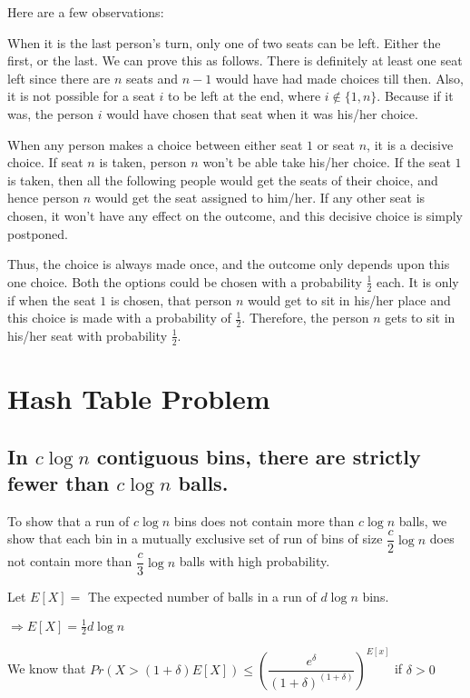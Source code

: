\documentclass{article}
\begin{document}
Here are a few observations: 

When it is the last person's turn, only one of two seats can be left. 
Either the first, or the last. We can prove this as follows. There is definitely 
at least one seat left since there are $n$ seats and $n-1$ would have had made 
choices till then. Also, it is not possible for a seat $i$ to be
left at the end, where $i \notin  \{ 1, n \}$. Because if it was, the person $i$ would
have chosen that seat when it was his/her choice. 

When any person makes a choice between either seat $1$ or seat $n$, it is a decisive choice.
If seat $n$ is taken, person $n$ won't be able take his/her choice. If the seat
$1$ is taken, then all the following people would get the seats of their choice, and
hence person $n$ would get the seat assigned to him/her. If any other seat is 
chosen, it won't have any effect on the outcome, and this decisive choice
is simply postponed. 

Thus, the choice is always made once, and the outcome only depends upon this one
choice. Both the options could be chosen with a probability $\frac{1}{2}$ each. It is
only if when the seat $1$ is chosen, that person $n$ would get to sit in his/her place
and this choice is made with a probability of $\frac{1}{2}$. Therefore, the person
$n$ gets to sit in his/her seat with probability $\frac{1}{2}$. 


\clearpage

\section{Hash Table Problem}
\subsection{In $c\log{n}$ contiguous bins, there are strictly
fewer than $c\log{n}$ balls.}

To show that a run of $c\log{n}$ bins does not contain more than
$c\log{n}$ balls, we show that each bin in a mutually exclusive set of run of bins
of size $\dfrac{c}{2}\log{n}$ does not contain more than
$\dfrac{c}{3}\log{n}$ balls with high probability.

Let $E[X] =$ The expected number of balls in a run of $d\log{n}$ bins.

$\Rightarrow E[X] = \frac{1}{2}d\log{n}$

We know that $Pr(X > (1+\delta)E[X]) \le \left( \dfrac{e^\delta}{(1+\delta)^{(1+\delta)}} \right)^{E[x]}$ if $\delta > 0$
\end{document}
